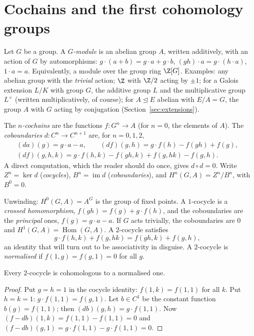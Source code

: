 \section{Cochains and the first cohomology groups}

Let $G$ be a group. A \emph{$G$-module} is an abelian group $A$, written additively, with an action of $G$ by automorphisms: $g\cdot(a+b)=g\cdot a+g\cdot b$, $(gh)\cdot a=g\cdot(h\cdot a)$, $1\cdot a=a$. Equivalently, a module over the
group ring $\Z[G]$. Examples: any abelian group with the \emph{trivial} action; $\Z$ with $\Z/2$ acting by $\pm1$; for a Galois extension $L/K$ with group $G$, the additive group $L$ and the multiplicative group $L^\times$ (written
multiplicatively, of course); for $A\trianglelefteq E$ abelian with $E/A=G$, the group $A$ with $G$ acting by conjugation (Section~\ref{sec:extensions}).

\begin{definition}\label{def:cochains}
The \emph{$n$-cochains} are the functions $f\colon G^n\to A$ (for $n=0$, the elements of $A$). The \emph{coboundaries} $d\colon C^n\to C^{n+1}$ are, for $n=0,1,2$,
\[
\begin{gathered}
(da)(g)=g\cdot a-a,\qquad(df)(g,h)=g\cdot f(h)-f(gh)+f(g),\\
(df)(g,h,k)=g\cdot f(h,k)-f(gh,k)+f(g,hk)-f(g,h).
\end{gathered}
\]
A direct computation, which the reader should do once, gives $d\circ d=0$. Write $Z^n=\ker d$ (\emph{cocycles}), $B^n=\operatorname{im}d$ (\emph{coboundaries}), and $H^n(G,A)=Z^n/B^n$, with $B^0=0$.
\end{definition}

Unwinding: $H^0(G,A)=A^G$ is the group of fixed points. A $1$-cocycle is a \emph{crossed homomorphism}, $f(gh)=f(g)+g\cdot f(h)$, and the coboundaries are the \emph{principal} ones, $f(g)=g\cdot a-a$. If $G$ acts trivially, the
coboundaries are $0$ and $H^1(G,A)=\operatorname{Hom}(G,A)$. A $2$-cocycle satisfies
\[
g\cdot f(h,k)+f(g,hk)=f(gh,k)+f(g,h),
\]
an identity that will turn out to be associativity in disguise. A $2$-cocycle is \emph{normalised} if $f(1,g)=f(g,1)=0$ for all $g$.

\begin{lemma}\label{lem:normalised}
Every $2$-cocycle is cohomologous to a normalised one.
\end{lemma}

\begin{proof}
Put $g=h=1$ in the cocycle identity: $f(1,k)=f(1,1)$ for all $k$. Put $h=k=1$: $g\cdot f(1,1)=f(g,1)$. Let $b\in C^1$ be the constant function $b(g)=f(1,1)$; then $(db)(g,h)=g\cdot f(1,1)$. Now
$(f-db)(1,k)=f(1,1)-f(1,1)=0$ and $(f-db)(g,1)=g\cdot f(1,1)-g\cdot f(1,1)=0$.
\end{proof}

